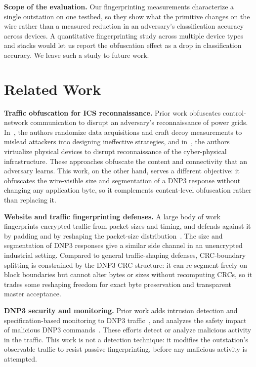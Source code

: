 \documentclass[conference]{IEEEtran}
\begin{document}
\noindent\textbf{Scope of the evaluation.} Our fingerprinting measurements
characterize a single outstation on one testbed, so they show what the primitive
changes on the wire rather than a measured reduction in an adversary's
classification accuracy across devices. A quantitative fingerprinting study
across multiple device types and stacks would let us report the obfuscation
effect as a drop in classification accuracy. We leave such a study to future
work.

\section{Related Work}

\noindent\textbf{Traffic obfuscation for ICS reconnaissance.} Prior work
obfuscates control-network communication to disrupt an adversary's reconnaissance
of power grids. In~\cite{ref:raincoat}, the authors randomize data acquisitions
and craft decoy measurements to mislead attackers into designing ineffective
strategies, and in~\cite{ref:defrec}, the authors virtualize physical devices to
disrupt reconnaissance of the cyber-physical infrastructure. These approaches
obfuscate the content and connectivity that an adversary learns. This work, on
the other hand, serves a different objective: it obfuscates the wire-visible size
and segmentation of a DNP3 response without changing any application byte, so it
complements content-level obfuscation rather than replacing it.

\noindent\textbf{Website and traffic fingerprinting defenses.} A large body of
work fingerprints encrypted traffic from packet sizes and timing, and defends
against it by padding and by reshaping the packet-size
distribution~\cite{ref:fp}. The size and segmentation of DNP3 responses give a
similar side channel in an unencrypted industrial setting. Compared to general
traffic-shaping defenses, CRC-boundary splitting is constrained by the DNP3 CRC
structure: it can re-segment freely on block boundaries but cannot alter bytes or
sizes without recomputing CRCs, so it trades some reshaping freedom for exact
byte preservation and transparent master acceptance.

\noindent\textbf{DNP3 security and monitoring.} Prior work adds intrusion
detection and specification-based monitoring to DNP3 traffic~\cite{ref:bro}, and
analyzes the safety impact of malicious DNP3 commands~\cite{ref:cps}. These
efforts detect or analyze malicious activity in the traffic. This work is not a
detection technique: it modifies the outstation's observable traffic to resist
passive fingerprinting, before any malicious activity is attempted.
\end{document}

